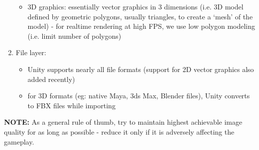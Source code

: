 \documentclass{article}[a4paper,12pt]
\theoremstyle{definition}
\begin{document}
\begin{enumerate}
\begin{itemize}
		\item 3D graphics: essentially vector graphics in 3 dimensions (i.e. 3D model defined by geometric polygons, usually triangles, to create a `mesh' of the model) - for realtime rendering at high FPS, we use low polygon modeling (i.e. limit number of polygons)
	\end{itemize}
	\item File layer:
	\begin{itemize}
		\item Unity supports nearly all file formats (support for 2D vector graphics also added recently)
		\item for 3D formats (eg: native Maya, 3ds Max, Blender files), Unity converts to FBX files while importing
	\end{itemize}
\end{enumerate}
\textbf{NOTE:} As a general rule of thumb, try to maintain highest achievable image quality for as long as possible - reduce it only if it is adversely affecting the gameplay.
\pagebreak
\end{document}
